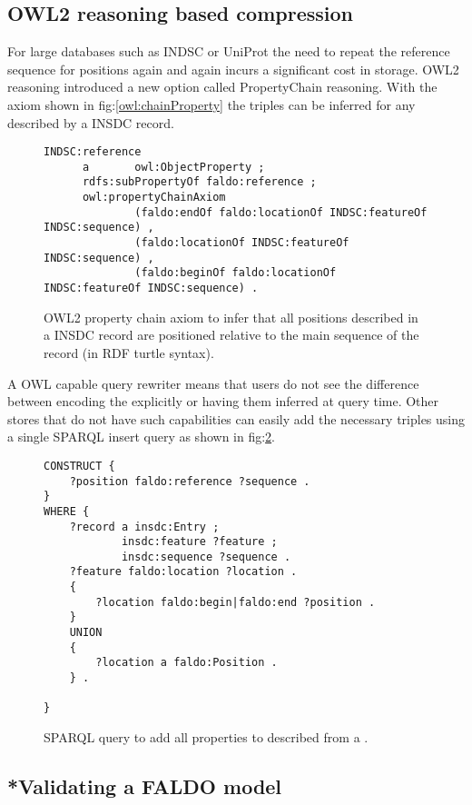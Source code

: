 \subsection*{OWL2 reasoning based compression}
For large databases such as INDSC or UniProt the need to repeat the reference sequence for positions again and again incurs a significant cost in storage.
OWL2 reasoning introduced a new option called PropertyChain reasoning. 
With the axiom shown in fig:\ref{owl:chainProperty} the  triples can be inferred for any  described by a INSDC record.
\begin{figure}
\begin{verbatim}
INDSC:reference
      a       owl:ObjectProperty ;
      rdfs:subPropertyOf faldo:reference ;
      owl:propertyChainAxiom
              (faldo:endOf faldo:locationOf INDSC:featureOf INDSC:sequence) , 
              (faldo:locationOf INDSC:featureOf INDSC:sequence) , 
              (faldo:beginOf faldo:locationOf INDSC:featureOf INDSC:sequence) .

\end{verbatim}
\caption{OWL2 property chain axiom to infer that all positions described in a INSDC record are positioned relative to the main sequence of the record (in RDF turtle syntax).}
\label{owl:chainProprty}
\end{figure}
A OWL capable query rewriter means that users do not see the difference between encoding the  explicitly or having them inferred at query time.
Other stores that do not have such capabilities can easily add the necessary triples using a single SPARQL insert query as shown in fig:\ref{sparql:chainProperty}.
\begin{figure}
\begin{verbatim}
CONSTRUCT {
    ?position faldo:reference ?sequence .
}
WHERE {
    ?record a insdc:Entry ;
            insdc:feature ?feature ;
            insdc:sequence ?sequence .
    ?feature faldo:location ?location .
    {
        ?location faldo:begin|faldo:end ?position .
    }
    UNION
    {
        ?location a faldo:Position .
    } .

}
\end{verbatim}
\caption{SPARQL query to add all  properties to  described from a .}
\label{sparql:chainProperty}
\end{figure}

\subsection{*Validating a FALDO model}

